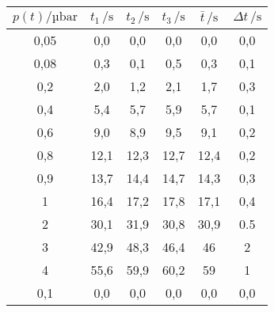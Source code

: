\begin{table}[htp]
	\begin{center}
		\begin{tabular}{c|ccc|cc}
			\toprule
			{$p(t) /\mathrm{µbar}$} & {$t_1\, /\mathrm{s}$} & {$t_2\, /\mathrm{s}$} & {$t_3\, /\mathrm{s}$} & {$\bar{t}\, /\mathrm{s}$} & {$\Delta t\, /\mathrm{s}$} \\ \midrule
			0,05           &          0,0          &          0,0          &          0,0          &            0,0            &            0,0             \\
			0,08           &          0,3          &          0,1          &          0,5          &            0,3            &            0,1             \\
			0,2           &          2,0          &          1,2          &          2,1          &            1,7            &            0,3             \\
			0,4           &          5,4          &          5,7          &          5,9          &            5,7            &            0,1             \\
			0,6           &          9,0          &          8,9          &          9,5          &            9,1            &            0,2             \\
			0,8           &         12,1          &         12,3          &         12,7          &           12,4            &            0,2             \\
			0,9           &         13,7          &         14,4          &         14,7          &           14,3            &            0,3             \\
			1            &         16,4          &         17,2          &         17,8          &           17,1            &            0,4             \\
			2            &         30,1          &         31,9          &         30,8          &           30,9            &            0.5             \\
			3            &         42,9          &         48,3          &         46,4          &            46             &             2              \\
			4            &         55,6          &         59,9          &         60,2          &            59             &             1              \\ \hline
			0,1           &          0,0          &          0,0          &          0,0          &            0,0            &            0,0             \\

\end{tabular}
\end{center}
\end{table}
